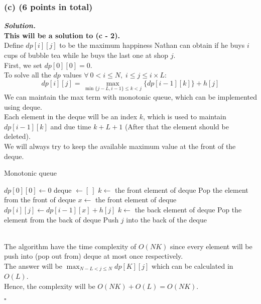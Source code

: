 \documentclass[12pt, a4paper, UTF8]{article}
\newenvironment{solution}[1][\it{Solution}]{\textbf{#1. }\\}{\begin{flushright}$\square$\end{flushright}}
\begin{document}
        \subsubsection*{(c) (6 points in total)}
            \begin{solution}
                \textbf{This will be a solution to (c - 2).}\\
                Define $dp[i][j]$ to be the maximum happiness Nathan can obtain if he buys $i$ cups of bubble tea while he buys the last one at shop $j$.\\
                First, we set $dp[0][0] = 0$.\\
                To solve all the $dp$ values $\forall\ 0 < i \le N,\;i \le j \le i \times L$:
                $$dp[i][j] = \max_{\min\{j - L, i - 1\} \le k < j}\{dp[i - 1][k]\} + h[j]$$
                We can maintain the max term with monotonic queue, which can be implemented using deque.\\
                Each element in the deque will be an index $k$, which is used to maintain $dp[i - 1][k]$ and due time $k + L + 1$ (After that the element should be deleted).\\
                We will always try to keep the available maximum value at the front of the deque.
                \begin{algorithm}
                    \caption{Monotonic queue}\label{alg:1}
                    $dp[0][0] \gets 0$\;
                     {
                        deque $\gets [\ ]$\;
                         {
                             {
                                $k \gets$ the front element of deque\;
                                 {
                                    Pop the element from the front of deque\;
                                }
                            }
                             {
                                $x \gets$ the front element of deque\;
                                $dp[i][j] \gets dp[i - 1][x] + h[j]$\;
                            }
                             {
                                $k \gets$ the back element of deque\;
                                 {
                                    Pop the element from the back of deque\;
                                }
                            }
                            Push $j$ into the back of the deque\;
                        }
                    }
                \end{algorithm} \\
                The algorithm have the time complexity of $O(NK)$ since every element will be push into (pop out from) deque at most once respectively.\\
                The answer will be $\max_{N - L < j \le N} dp[K][j]$ which can be calculated in $O(L)$.\\
                Hence, the complexity will be $O(NK) + O(L) = O(NK)$.
            \end{solution}
    \newpage
\end{document}

